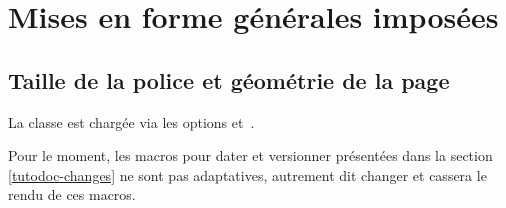 \documentclass{main}
\begin{document}
\section{Mises en forme générales imposées}

\subsection{Taille de la police et géométrie de la page}

La classe  est chargée via les options  et \,.


\begin{tdocwarn}
	Pour le moment, les macros pour dater et versionner présentées dans la section  \ref{tutodoc-changes} ne sont pas adaptatives, autrement dit changer  et  cassera le rendu de ces macros.
\end{tdocwarn}
\end{document}
